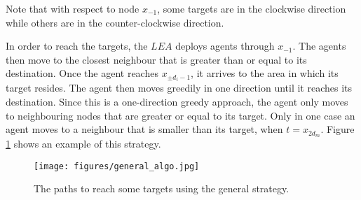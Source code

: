 Note that with respect to node $x_{-1}$, some targets are in the clockwise direction while others are in the counter-clockwise direction.

In order to reach the targets, the $LEA$ deploys agents through $x_{-1}$. The agents then move to the closest neighbour that is greater than or equal to its destination. Once the agent reaches $x_{\pm d_i-1}$, it arrives to the area in which its target resides. The agent then moves greedily in one direction until it reaches its destination. Since this is a one-direction greedy approach, the agent only moves to neighbouring nodes that are greater or equal  to its target. Only in one case an agent moves to a neighbour that is smaller than its target, when $t=x_{2d_m}$. Figure \ref{fig:general_algo} shows an example of this strategy.
\begin{figure}[H]
  \centering  
  \texttt{[image: figures/general\_algo.jpg]}
  \caption{ The paths to reach some targets using the general strategy.}\label{fig:general_algo}
\end{figure}


\begin{comment}

  \begin{figure}[h]
\centering
\texttt{[image: example.pdf]}
\caption{Chordal ring C(1,4,11,13,17)}
\label{fig:example}
\end{figure}

\end{comment}
 







